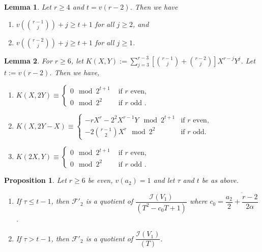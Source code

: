\documentclass[10pt,a4paper]{amsart}
\newtheorem{lemma}{Lemma}
\newtheorem{prop}{Proposition}
\begin{document}
\begin{lemma}\label{sl1cmb2}
Let $r\geq 4$ and $t=v(r-2)$. Then  we have  
\begin{enumerate}
    \item 
$v\left({r-1 \choose j}\right)+j \geq t+1$ for all $j\geq2$, and \label{sl1cmb2a}
\item $v\left({r-2 \choose j}\right)+j \geq t+1$ for all $j\geq1$.\label{sl1cmb2b}
\end{enumerate}
\end{lemma}

\begin{lemma}\label{K}
For $r\geq 6$, let $K(X,Y):= \displaystyle\sum_{j=3}^{r-3}\left[{r-1 \choose j}+{r-2\choose j} \right]X^{r-j}Y^j$. %
Let $t:=v(r-2)$. Then we have,
\begin{enumerate}
    \item $K(X,2Y) \equiv \begin{cases}
        0\mod 2^{t+1} & \text{ if }r\text{ even},\\
        0\mod 2^2 & \text{ if }r\text{ odd }.
        \end{cases} $
    \item $K(X,2Y-X) \equiv\begin{cases}
    -rX^{r}-2^2X^{r-1}Y\mod 2^{t+1} & \text{if $r$ even,}\label{Kb}\\
     -2{r-1 \choose 2}X^{r} \mod 2^{2}& \text{if $r$ odd.}    \end{cases}$
    \item $K(2X,Y) \equiv \begin{cases}
        0\mod 2^{t+1} & \text{ if }r\text{ even},\\
        0\mod 2^2 & \text{ if }r\text{ odd }.
        \end{cases} $
    \end{enumerate}
\end{lemma}

\begin{prop}\label{F2'}
    Let $r\geq6$ be even, $v(a_{2})=1$ and let $\tau$ and $t$ be as above.
    \begin{enumerate}
        \item If $\tau\leq t-1$, then $\mathcal{F'}_{2}$ is a quotient of $\dfrac{\mathcal{I}(V_{1})}{(T^{2}-c_{0}T+1)}$ where $c_{0} = \overline{\dfrac{a_{2}}{2} + \dfrac{r-2}{2\alpha}}$ .
        \item If $\tau>t-1$, then $\mathcal{F'}_{2}$ is a quotient of $\dfrac{\mathcal{I}(V_{1})}{(T)}$.                             \end{enumerate}
\end{prop}
\end{document}
